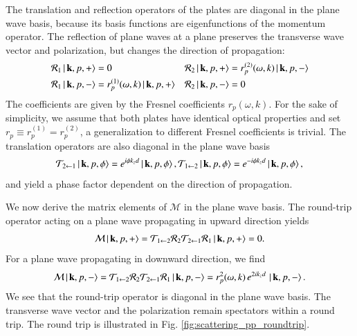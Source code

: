 The translation and reflection operators of the plates are diagonal in the
plane wave basis, because its basis functions are eigenfunctions of the
momentum operator. The reflection of plane waves at a plane preserves the
transverse wave vector and polarization, but changes the direction of
propagation:
\begin{align}
\mathcal{R}_1 \ket{\, {\mathbf{k}}, p, +} &= 0                                          & \mathcal{R}_2 \ket{\, {\mathbf{k}}, p, +} &= r_p^{(2)}(\omega, k) \ket{\, {\mathbf{k}}, p, -} \\
\mathcal{R}_1 \ket{\, {\mathbf{k}}, p, -} &= r_p^{(1)}(\omega, k) \ket{\, {\mathbf{k}}, p, +} & \mathcal{R}_2 \ket{\, {\mathbf{k}}, p, -} &= 0
\end{align}
The coefficients are given by the Fresnel coefficients $r_p(\omega,k)$. For the
sake of simplicity, we assume that both plates have identical optical
properties and set $r_p\equiv r_p^{(1)} = r_p^{(2)}$, a generalization to
different Fresnel coefficients is trivial. The translation operators are also
diagonal in the plane wave basis
\begin{equation}
\mathcal{T}_{2\leftarrow1} \ket{\, {\mathbf{k}}, p, \phi} = e^{i \phi k_z d} \ket{\, {\mathbf{k}}, p, \phi}, \\ \mathcal{T}_{1\leftarrow2} \ket{\, {\mathbf{k}}, p, \phi} = e^{-i \phi k_z d} \ket{\, {\mathbf{k}}, p, \phi},
\end{equation}
and yield a phase factor dependent on the direction of propagation.

We now derive the matrix elements of $\mathcal{M}$ in the
plane wave basis. The round-trip operator acting on a plane wave propagating in
upward direction yields
\begin{equation}
\mathcal{M} \ket{ \, {\mathbf{k}}, p, +} = \mathcal{T}_{1\leftarrow 2} \mathcal{R}_2 \mathcal{T}_{2\leftarrow 1} \mathcal{R}_1\ket{ \, {\mathbf{k}}, p, +} = 0.
\end{equation}
For a plane wave propagating in downward direction, we find
\begin{equation}
\mathcal{M} \ket{ \, {\mathbf{k}}, p, -} = \mathcal{T}_{1\leftarrow 2} \mathcal{R}_2 \mathcal{T}_{2\leftarrow 1} \mathcal{R}_1\ket{ \, {\mathbf{k}}, p, -} = r_p^2(\omega,k) \, e^{2 i k_z d} \, \ket{\, {\mathbf{k}}, p, -}.
\end{equation}
We see that the round-trip operator is diagonal in the plane wave
basis. The transverse wave vector and the polarization remain spectators within
a round trip. The round trip is illustrated in Fig.
\ref{fig:scattering_pp_roundtrip}.

